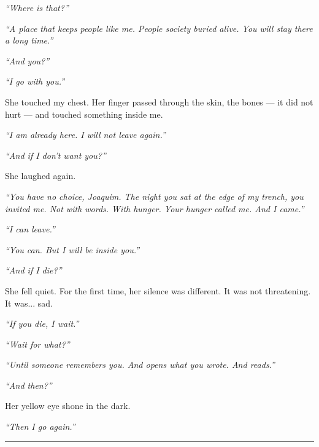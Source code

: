 \noindent \textit{\textquotedblleft{}Where is that?\textquotedblright{}}

\noindent \textit{\textquotedblleft{}A place that keeps people like me. People society buried alive. You will stay there a long time.\textquotedblright{}}

\noindent \textit{\textquotedblleft{}And you?\textquotedblright{}}

\noindent \textit{\textquotedblleft{}I go with you.\textquotedblright{}}

\noindent She touched my chest. Her finger passed through the skin, the bones --- it did not hurt --- and touched something inside me.

\noindent \textit{\textquotedblleft{}I am already here. I will not leave again.\textquotedblright{}}

\noindent \textit{\textquotedblleft{}And if I don't want you?\textquotedblright{}}

\noindent She laughed again.

\noindent \textit{\textquotedblleft{}You have no choice, Joaquim. The night you sat at the edge of my trench, you invited me. Not with words. With hunger. Your hunger called me. And I came.\textquotedblright{}}

\noindent \textit{\textquotedblleft{}I can leave.\textquotedblright{}}

\noindent \textit{\textquotedblleft{}You can. But I will be inside you.\textquotedblright{}}

\noindent \textit{\textquotedblleft{}And if I die?\textquotedblright{}}

\noindent She fell quiet. For the first time, her silence was different. It was not threatening. It was... sad.

\noindent \textit{\textquotedblleft{}If you die, I wait.\textquotedblright{}}

\noindent \textit{\textquotedblleft{}Wait for what?\textquotedblright{}}

\noindent \textit{\textquotedblleft{}Until someone remembers you. And opens what you wrote. And reads.\textquotedblright{}}

\noindent \textit{\textquotedblleft{}And then?\textquotedblright{}}

\noindent Her yellow eye shone in the dark.

\noindent \textit{\textquotedblleft{}Then I go again.\textquotedblright{}}

\vspace{0.5em}\noindent\rule{\textwidth}{0.5pt}\vspace{0.5em}

